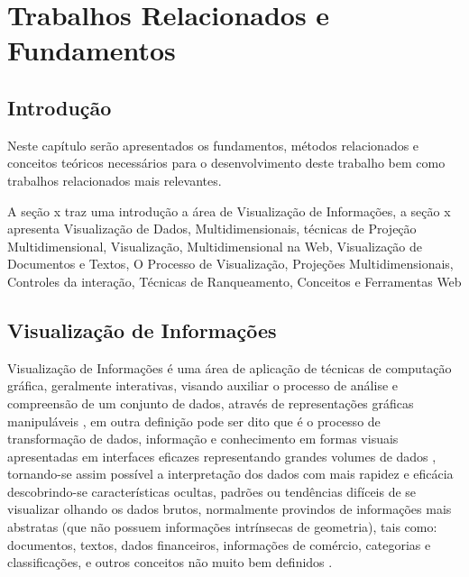\newcommand{\R}[1]{\ensuremath{\mathbb{R}^{#1}}}
\newcommand{\DB}{\ensuremath{\mathcal{D}}}


\chapter{Trabalhos Relacionados e Fundamentos}
\label{cap-trab-relacionados}

\section{Introdução}

Neste capítulo serão apresentados os fundamentos, métodos relacionados e conceitos teóricos necessários para o desenvolvimento deste trabalho bem como trabalhos relacionados mais relevantes.

A seção x traz uma introdução a área de Visualização de Informações, a seção x apresenta Visualização de Dados, Multidimensionais, técnicas de Projeção Multidimensional, Visualização, Multidimensional na Web,  Visualização de Documentos e Textos, O Processo de Visualização,  Projeções Multidimensionais,  Controles da interação, Técnicas de Ranqueamento,  Conceitos e Ferramentas Web

\section{Visualização de Informações}

Visualização de Informações é uma área de aplicação de técnicas de computação gráfica, geralmente interativas, visando auxiliar o processo de análise e compreensão de um conjunto de dados, através de representações gráficas manipuláveis \cite{gershon1998information}, em outra definição pode ser dito que é o processo de transformação de dados, informação e conhecimento em formas visuais apresentadas em interfaces eficazes representando grandes volumes de dados \cite{vaz2004visualizacao}, tornando-se assim possível a interpretação dos dados com mais rapidez e eficácia descobrindo-se características ocultas, padrões ou tendências difíceis de se visualizar olhando os dados brutos, normalmente provindos de  informações mais abstratas (que não possuem informações intrínsecas de geometria), tais como: documentos, textos, dados financeiros, informações de comércio, categorias e classificações, e  outros conceitos não muito bem definidos \cite{gershon1998information} .


